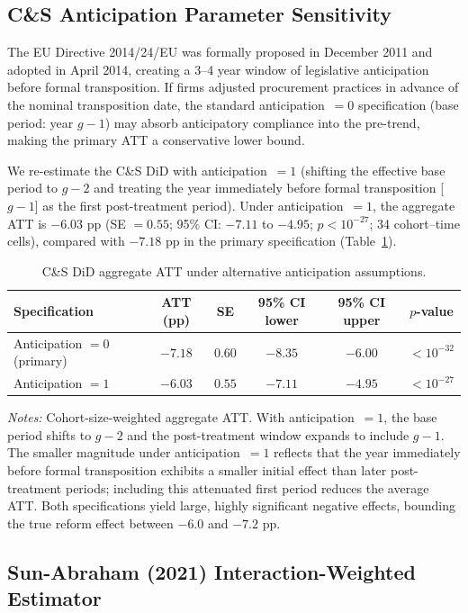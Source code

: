 \documentclass[11pt]{article}
\newcommand{\tabnoteblock}[1]{%
    \par\vspace{0.45em}%
    \begin{minipage}{0.98\linewidth}
    \footnotesize\raggedright #1
    \end{minipage}\par
}
\newcommand{\tabnotes}[1]{\tabnoteblock{\textit{Notes:} #1}}
\begin{document}
\subsection{C\&S Anticipation Parameter Sensitivity}

The EU Directive 2014/24/EU was formally proposed in December 2011 and adopted in April 2014, creating a 3--4 year window of legislative anticipation before formal transposition. If firms adjusted procurement practices in advance of the nominal transposition date, the standard anticipation~$=0$ specification (base period: year $g-1$) may absorb anticipatory compliance into the pre-trend, making the primary ATT a conservative lower bound.

We re-estimate the C\&S DiD with anticipation~$=1$ (shifting the effective base period to $g-2$ and treating the year immediately before formal transposition [$g-1$] as the first post-treatment period). Under anticipation~$=1$, the aggregate ATT is $-6.03$ pp (SE $= 0.55$; 95\% CI: $-7.11$ to $-4.95$; $p < 10^{-27}$; 34 cohort--time cells), compared with $-7.18$ pp in the primary specification (Table~\ref{tab:anticipation_sensitivity}).

\begin{table}[H]
\centering
\caption{C\&S DiD aggregate ATT under alternative anticipation assumptions.}
\label{tab:anticipation_sensitivity}
\begin{tabular}{lccccc}
\toprule
\textbf{Specification} & \textbf{ATT (pp)} & \textbf{SE} & \textbf{95\% CI lower} & \textbf{95\% CI upper} & \textbf{$p$-value} \\
\midrule
Anticipation $= 0$ (primary) & $-7.18$ & $0.60$ & $-8.35$ & $-6.00$ & $<10^{-32}$ \\
Anticipation $= 1$ & $-6.03$ & $0.55$ & $-7.11$ & $-4.95$ & $<10^{-27}$ \\
\bottomrule
\end{tabular}
\tabnotes{Cohort-size-weighted aggregate ATT. With anticipation~$= 1$, the base period shifts to $g-2$ and the post-treatment window expands to include $g-1$. The smaller magnitude under anticipation~$= 1$ reflects that the year immediately before formal transposition exhibits a smaller initial effect than later post-treatment periods; including this attenuated first period reduces the average ATT. Both specifications yield large, highly significant negative effects, bounding the true reform effect between $-6.0$ and $-7.2$ pp.
}
\end{table}

\subsection{Sun-Abraham (2021) Interaction-Weighted Estimator}
\end{document}
